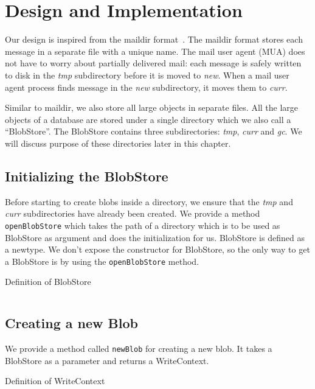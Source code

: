 \chapter{Design and Implementation}
\label{chap:design}

Our design is inspired from the maildir format~\cite{bernstein1995using}. The maildir format stores each message in a separate file with a unique name. The mail user agent (MUA) does not have to worry about partially delivered mail: each message is safely written to disk in the \textit{tmp} subdirectory before it is moved to \textit{new}. When a mail user agent process finds message in the \textit{new} subdirectory, it moves them to \textit{curr}.

Similar to maildir, we also store all large objects in separate files. All the large objects of a database are stored under a single directory which we also call a ``BlobStore''.
The BlobStore contains three subdirectories: \textit{tmp}, \textit{curr} and \textit{gc}. We will discuss purpose of these directories later in this chapter.

\section{Initializing the BlobStore}
Before starting to create blobs inside a directory, we ensure that the \textit{tmp} and \textit{curr} subdirectories have already been created. We provide a method \texttt{openBlobStore} which takes the path of a directory which is to be used as BlobStore as argument and does the initialization for us.
BlobStore is defined as a newtype. We don't expose the constructor for BlobStore, so the only way to get a BlobStore is by using the \texttt{openBlobStore} method.

\begin{program}
  \caption{Definition of BlobStore}
  \label{prog:defblobstore}
  \inputminted{haskell}{hs/blobstore.hs}
\end{program}

\section{Creating a new Blob}
We provide a method called \texttt{newBlob} for creating a new blob. It takes a BlobStore as a parameter and returns a WriteContext.

\begin{program}
  \caption{Definition of WriteContext}
  \label{prog:defwritecontext}
  \inputminted{haskell}{hs/writecontext.hs}
\end{program}


